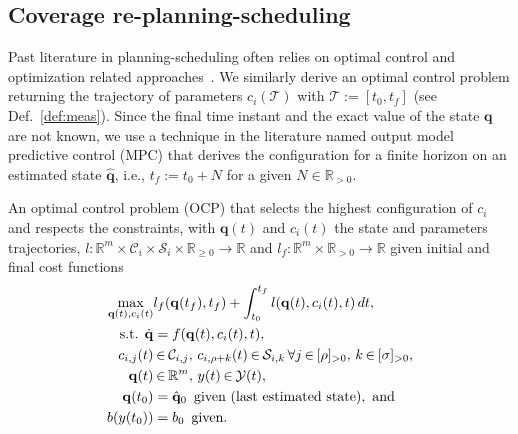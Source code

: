 \documentclass[letterpaper,10pt,journal,twoside]{IEEEtran}
\theoremstyle{definition}
\begin{document}
\subsection{Coverage re-planning-scheduling}
\label{sec:repla-algo}

Past literature in planning-scheduling often relies on optimal control and optimization related approaches~\cite{brateman2006energy,zhang2007low,ondruska2015scheduled,lahijanian2018resource}. We similarly derive an optimal control problem returning the trajectory of parameters $c_i(\mathcal{T})$ with $\mathcal{T}:=[t_0,t_f]$ (see Def.~\ref{def:meas}). Since the final time instant and the exact value of the state $\mathbf{q}$ are not known, we use a technique in the literature named output model predictive control (MPC) that derives the configuration for a finite horizon on an estimated state $\hat{\mathbf{q}}$, i.e., $t_f:=t_0+N$ for a given $N\in\mathbb{R}_{>0}$.

An optimal control problem (OCP) that selects the highest configuration of $c_i$ and respects the constraints, with $\mathbf{q}(t)$ and $c_i(t)$ the state and parameters trajectories, $l:\mathbb{R}^m\times\mathcal{C}_i\times\mathcal{S}_i\times\mathbb{R}_{\geq 0}\rightarrow\mathbb{R}$ and $l_f:\mathbb{R}^m\times\mathbb{R}_{> 0}\rightarrow\mathbb{R}$ given initial and final cost functions
\begin{subequations}\label{eq:ocp-output-mpc}\begin{align}
  \max_{\mathbf{q}(t),c_i(t)}&{l_f(\mathbf{q}(t_f),t_f)+\int_{t_0}^{t_f}{l(\mathbf{q}(t),c_i(t),t)\,dt}},\label{eq:ocp-costs}\\
  \text{s.t. }\dot{\mathbf{q}}&=f(\mathbf{q}(t),c_i(t),t),\label{eq:dyn-evol}\\
  c_{i,j}(t)&\hspace*{-.2ex}\in\hspace*{-.2ex}\mathcal{C}_{i,j},\,c_{i,\rho+k}(t)\hspace*{-.2ex}\in\hspace*{-.2ex}\mathcal{S}_{i,k}\,\forall j\hspace*{-.2ex}\in\hspace*{-.2ex}[\rho]_{>0},\,k\hspace*{-.2ex}\in\hspace*{-.2ex}[\sigma]_{>0},\label{eq:state-cont-const-mpc}\\
  \mathbf{q}(t)&\hspace*{-.2ex}\in\hspace*{-.2ex}\mathbb{R}^m,\,y(t)\hspace*{-.2ex}\in\hspace*{-.2ex}\mathcal{Y}(t),\label{eq:batt-const-mpc}\\
  \mathbf{q}(t_0)&=\hat{\mathbf{q}}_0\,\,\,\text{given (last estimated state)},\text{ and}\label{eq:ocp-outp-mpc-state-est}\\
  b(y(t_0))&=b_0\,\,\,\text{given}\label{eq:ocp-outp-bat}.
\end{align}\end{subequations}
\end{document}

